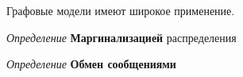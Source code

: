 Графовые модели имеют широкое применение.




\textit{Определение} \textbf{Маргинализацией} распределения



\textit{Определение} \textbf{Обмен сообщениями}